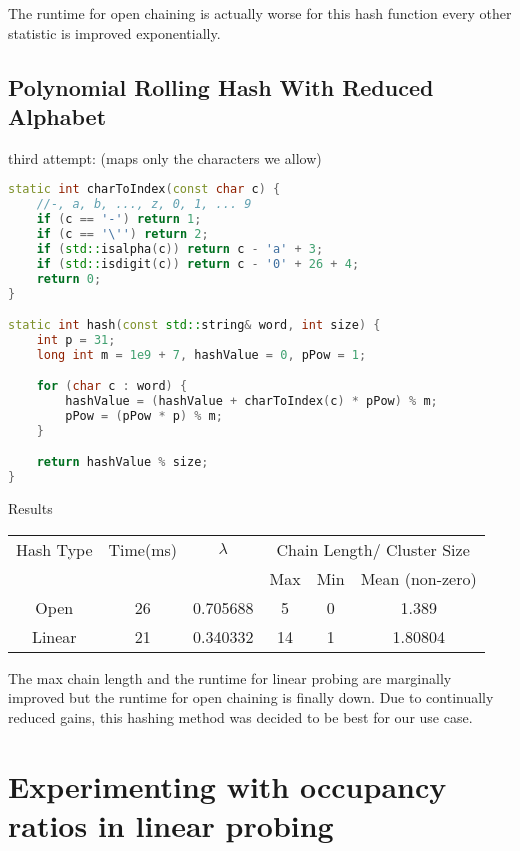 \documentclass[12pt]{article}
\begin{document}
The runtime for open chaining is actually worse for this hash function every other statistic is improved exponentially.

\subsection{Polynomial Rolling Hash With Reduced Alphabet}

third attempt: (maps only the characters we allow)
\begin{lstlisting}[language=C++]
static int charToIndex(const char c) {
    //-, a, b, ..., z, 0, 1, ... 9
    if (c == '-') return 1;
    if (c == '\'') return 2;
    if (std::isalpha(c)) return c - 'a' + 3;
    if (std::isdigit(c)) return c - '0' + 26 + 4;
    return 0;
}

static int hash(const std::string& word, int size) {
    int p = 31;
    long int m = 1e9 + 7, hashValue = 0, pPow = 1;

    for (char c : word) {
        hashValue = (hashValue + charToIndex(c) * pPow) % m;
        pPow = (pPow * p) % m;
    }

    return hashValue % size;
}
\end{lstlisting}

\begin{center}
Results\\
\begin{tabular}{|c|c|c|c|c|c|}
\hline
Hash Type & Time(ms) & $\lambda$ & \multicolumn{3}{|c|}{Chain Length/ Cluster Size} \\
 & & & Max & Min & Mean (non-zero) \\
\hline
Open & 26 & 0.705688 & 5 & 0 & 1.389\\
Linear & 21 & 0.340332 & 14 & 1 & 1.80804\\
\hline
\end{tabular}
\end{center}

The max chain length and the runtime for linear probing are marginally improved but the runtime for open chaining is finally down. Due to continually reduced gains, this hashing method was decided to be best for our use case.

\section{Experimenting with occupancy ratios in linear probing}
\end{document}
